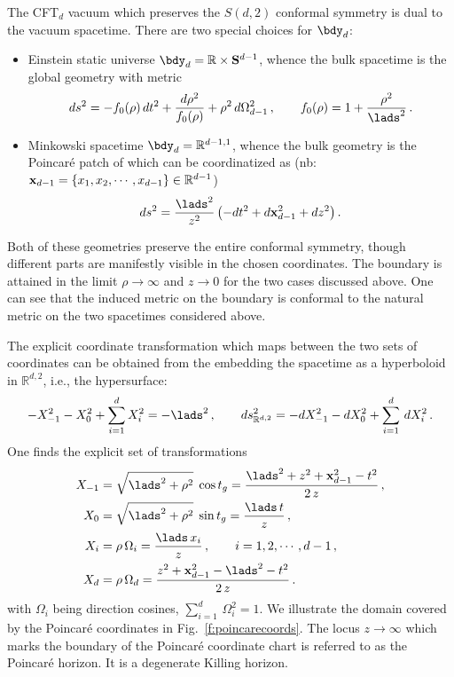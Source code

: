 \documentclass[12pt,openany]{book}
\begin{document}
The CFT$_d$ vacuum which preserves the $S(d,2)$ conformal symmetry is dual to the vacuum  spacetime. There are two special choices for $\bdy_d$:
\begin{itemize}
\item Einstein static universe $\bdy_d = {\mathbb R}\times {\bf S}^{d-1}$, whence the bulk spacetime is the global  geometry with metric
%
\begin{equation}
ds^2 = -f_0(\rho)\, dt^2 + \frac{d\rho^2}{f_0(\rho)} + \rho^2 \, d\Omega_{d-1}^2 \,, \qquad f_0(\rho) =1+\frac{\rho^2}{\lads^2} \,.
\label{eq:gads}
\end{equation}
%
\item  Minkowski spacetime $\bdy_d = {\mathbb R}^{d-1,1}$, whence the bulk geometry is the Poincar\'e patch of  which can be coordinatized as (nb: ${\bf x}_{d-1} = \{x_1, x_2, \cdots , x_{d-1}\} \in {\mathbb R}^{d-1}$)
%
\begin{equation}
ds^2 = \frac{\lads^2}{z^2} \left(-dt^2 + d{\bf x}_{d-1}^2 + dz^2 \right) .
\label{eq:pads}
\end{equation}
%
\end{itemize}

Both of these geometries preserve the entire conformal symmetry, though different parts are manifestly visible in the chosen coordinates.
The boundary is attained in the limit $\rho \to \infty$ and $z\to 0$ for the two cases discussed above. One can see that the induced metric on the boundary is conformal to the natural metric on the two spacetimes considered above.

The explicit coordinate transformation which maps between the two sets of coordinates can be obtained from the embedding the  spacetime as a hyperboloid in ${\mathbb R}^{d,2}$, i.e., the hypersurface:
%
\begin{equation}
-X_{-1}^2 -X_0^2  +\sum_{i=1}^d X_i ^2 = -\lads^2 \,, \qquad  ds^2_{{\mathbb R}^{d,2}} =  -dX_{-1}^2 -dX_0^2  +\sum_{i=1}^d \, dX_i^2 \,.
\label{eq:hyperd2}
\end{equation}
%
One finds the explicit set of transformations
%
\begin{equation}
\begin{split}
X_{-1 } &= \sqrt{\lads^2+\rho^2}\;\cos t_g=\frac{\lads^2+  z^2+{\bf x}_{d-1}^2-t^2}{2\,z} \,, \\
X_0 &= \sqrt{\lads^2+\rho^2}\; \sin t_g=\frac{\lads\, t}{z} \,,   \\
X_i & = \rho\, \Omega_{i}=\frac{\lads\, x_i}{z} \,, \qquad i=1,2,\cdots, d-1 \,, \\
X_d &= \rho\, \Omega_{d} =  \frac{z^2+{\bf x}_{d-1}^2 -\lads^2-t^2}{2\, z} \,.
\end{split}
\label{eq:gtopc}
\end{equation}
%
with $\Omega_i$ being direction cosines, $\sum_{i=1}^d \, \Omega_i^2 =1$. We illustrate the domain covered by the Poincar\'e coordinates in Fig.~\ref{f:poincarecoords}. The locus $z\to \infty$ which marks the boundary of the Poincar\'e coordinate chart is  referred to as the Poincar\'e horizon. It is a degenerate Killing horizon.
\end{document}
